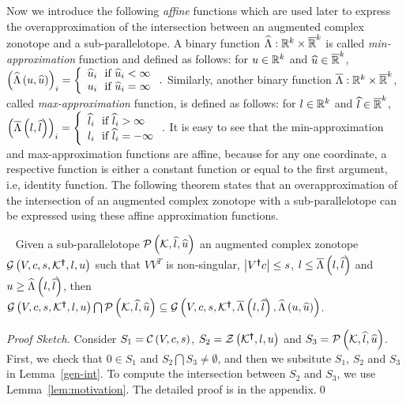 Now we introduce the following \emph{affine} functions which are used later to
express the overapproximation of the intersection between an augmented
complex zonotope and a sub-parallelotope.
%
A binary function
$\widehat{\Lambda}:\mathbb{R}^k\times\mathbb{\overline{R}}^k$ is
called \emph{min-approximation} function and defined as follows: for
$u\in\mathbb{R}^k$ and $\widehat{u}\in\mathbb{\overline{R}}^k$,
$\left(\widehat{\Lambda}\left(u,\widehat{u}\right)\right)_i = \left\{
\begin{array}{l}
\widehat{u}_i~~\text{if}~\widehat{u}_i<\infty\\
u_i~~\text{if}~\widehat{u}_i=\infty
\end{array}
\right..$
Similarly, another binary function       
$\overline{\Lambda}:\mathbb{R}^k\times\mathbb{\overline{R}}^k$,
called \emph{max-approximation} function, is defined as follows: for
$l\in\mathbb{R}^k$ and $\widehat{l}\in\mathbb{\overline{R}}^k$,
$\left(\overline{\Lambda}\left(l,\widehat{l}\right)\right)_i = \left\{
\begin{array}{l}
\widehat{l}_i~~\text{if}~\widehat{l}_i>\infty\\
l_i~~\text{if}~\widehat{l}_i=-\infty
\end{array}
\right..$
It is easy to see that the min-approximation and max-approximation functions are affine, because for any one coordinate, a respective function is either a constant function or equal to the first argument, i.e, identity function.
%
The following theorem states that an overapproximation of the intersection
of an augmented complex zonotope with a sub-parallelotope can be
expressed using these affine approximation functions.
\begin{theorem}~\label{thm:acz-int}
Given a sub-parallelotope $\mathcal{P}\left(\mathcal{K},\widehat{l},\widehat{u}\right)$ an
augmented complex zonotope $\mathcal{G}\left(V,c,s,\mathcal{K}^{\bm{\dagger}},l,u\right)$
such that $VV^T$ is non-singular, $\left|V^{\bm{\dagger}}c\right|\leq s$, $l\leq
\overline{\Lambda}\left(l,\widehat{l}\right)$ and $u\geq \widehat{\Lambda}\left(l,\widehat{l}\right)$, then
$\mathcal{G}\left(V,c,s,\mathcal{K}^{\bm{\dagger}},l,u\right)\bigcap\mathcal{P}\left(\mathcal{K},\widehat{l},\widehat{u}\right)\subseteq
\mathcal{G}\left(V,c,s,\mathcal{K}^{\bm{\dagger}},\overline{\Lambda}\left(l,\widehat{l}\right),\widehat{\Lambda}\left(u,\widehat{u}\right)\right)$.
\end{theorem}
\emph{Proof Sketch.}  Consider $S_1 = \mathcal{C}\left(V,c,s\right)$, $S_2 =
\mathcal{Z}\left(\mathcal{K}^{\bm{\dagger}},l,u\right)$ and $S_3 =
\mathcal{P}\left(\mathcal{K},\widehat{l},\widehat{u}\right)$.  First, we check that $0\in S_1$
and $S_2\bigcap S_3\neq \emptyset$, and then we subsitute $S_1$, $S_2$
and $S_3$ in Lemma~\ref{gen-int}.  To compute the intersection
between $S_2$ and $S_3$, we use Lemma~\ref{lem:motivation}.  The
detailed proof is in the appendix.\qed


